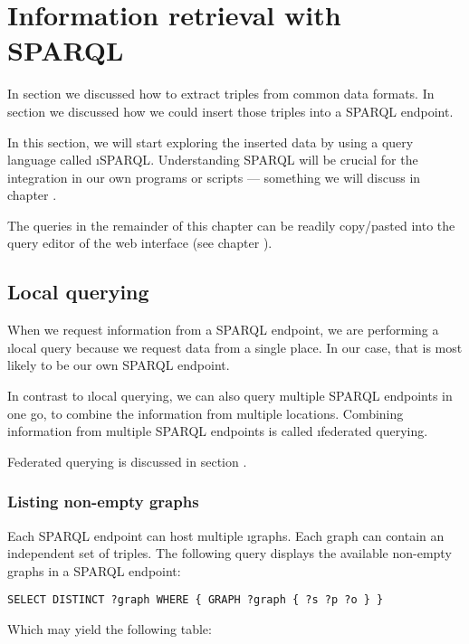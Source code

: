 \chapter{Information retrieval with SPARQL}
\label{chap:information-retrieval}

  In section  we discussed how to extract triples from
  common data formats.  In section  we discussed how we
  could insert those triples into a SPARQL endpoint.

  In this section, we will start exploring the inserted data by using a
  query language called \i{SPARQL}.  Understanding SPARQL will be crucial
  for the integration in our own programs or scripts --- something we will
  discuss in chapter .

  The queries in the remainder of this chapter can be readily copy/pasted into
  the query editor of the web interface (see chapter
  ).

\section{Local querying}

  When we request information from a SPARQL endpoint, we are performing a
  \i{local query} because we request data from a single place.  In our case,
  that is most likely to be our own SPARQL endpoint.

  In contrast to \i{local querying}, we can also query multiple SPARQL
  endpoints in one go, to combine the information from multiple locations.
  Combining information from multiple SPARQL endpoints is called \i{federated
    querying}.

  Federated querying is discussed in section .

\subsection{Listing non-empty graphs}
\label{sec:non-empty-graphs}
  Each SPARQL endpoint can host multiple \i{graphs}.  Each graph can contain
  an independent set of triples.  The following query displays the available
  non-empty graphs in a SPARQL endpoint:

\begin{lstlisting}[language=SPARQL]
SELECT DISTINCT ?graph WHERE { GRAPH ?graph { ?s ?p ?o } }
\end{lstlisting}

Which may yield the following table:


